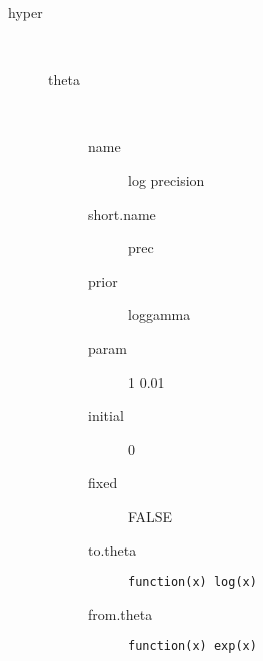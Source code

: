 \begin{description}
	\item[hyper]\ 
	 \begin{description}
	 	\item[theta]\ 
	 	 \begin{description}
	 	 	\item[name] log precision
	 	 	\item[short.name] prec
	 	 	\item[prior] loggamma
	 	 	\item[param] 1 0.01
	 	 	\item[initial] 0
	 	 	\item[fixed] FALSE
	 	 	\item[to.theta] \verb|function(x) log(x)|
	 	 	\item[from.theta] \verb|function(x) exp(x)|
	 	 \end{description}
	 \end{description}
\end{description}

